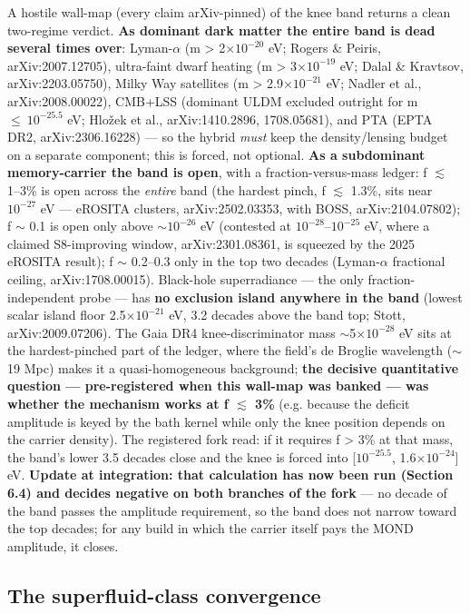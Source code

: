 \documentclass[11pt,a4paper]{article}
\begin{document}
A hostile wall-map (every claim arXiv-pinned) of the knee band returns a clean two-regime verdict. \textbf{As dominant dark matter the entire band is dead several times over}: Lyman-$\alpha$ (m > 2$\times10^{-20}$ eV; Rogers \& Peiris, arXiv:2007.12705), ultra-faint dwarf heating (m > 3$\times10^{-19}$ eV; Dalal \& Kravtsov, arXiv:2203.05750), Milky Way satellites (m > 2.9$\times10^{-21}$ eV; Nadler et al., arXiv:2008.00022), CMB+LSS (dominant ULDM excluded outright for m $\le\ 10^{-25.5}$ eV; Hlo\v{z}ek et al., arXiv:1410.2896, 1708.05681), and PTA (EPTA DR2, arXiv:2306.16228) --- so the hybrid \emph{must} keep the density/lensing budget on a separate component; this is forced, not optional. \textbf{As a subdominant memory-carrier the band is open}, with a fraction-versus-mass ledger: f $\lesssim$ 1--3\% is open across the \emph{entire} band (the hardest pinch, f $\lesssim$ 1.3\%, sits near $10^{-27}$ eV --- eROSITA clusters, arXiv:2502.03353, with BOSS, arXiv:2104.07802); f $\sim$ 0.1 is open only above $\sim{}10^{-26}$ eV (contested at $10^{-28}$--$10^{-25}$ eV, where a claimed S8-improving window, arXiv:2301.08361, is squeezed by the 2025 eROSITA result); f $\sim$ 0.2--0.3 only in the top two decades (Lyman-$\alpha$ fractional ceiling, arXiv:1708.00015). Black-hole superradiance --- the only fraction-independent probe --- has \textbf{no exclusion island anywhere in the band} (lowest scalar island floor 2.5$\times10^{-21}$ eV, 3.2 decades above the band top; Stott, arXiv:2009.07206). The Gaia DR4 knee-discriminator mass $\sim$5$\times10^{-28}$ eV sits at the hardest-pinched part of the ledger, where the field's de Broglie wavelength ($\sim$19 Mpc) makes it a quasi-homogeneous background; \textbf{the decisive quantitative question --- pre-registered when this wall-map was banked --- was whether the mechanism works at f $\lesssim$ 3\%} (e.g. because the deficit amplitude is keyed by the bath kernel while only the knee position depends on the carrier density). The registered fork read: if it requires f > 3\% at that mass, the band's lower 3.5 decades close and the knee is forced into [$10^{-25.5}$, 1.6$\times10^{-24}$] eV. \textbf{Update at integration: that calculation has now been run (Section 6.4) and decides negative on both branches of the fork} --- no decade of the band passes the amplitude requirement, so the band does not narrow toward the top decades; for any build in which the carrier itself pays the MOND amplitude, it closes.

\subsection{The superfluid-class convergence}
\end{document}
